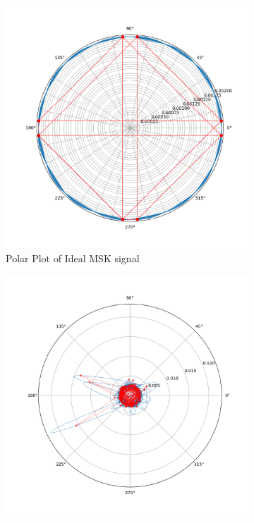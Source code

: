 \begin{figure}[H]
    \centering
    \begin{subfigure}[b]{0.4\textwidth}
        \centering
        \includegraphics[width = \textwidth]{figs/sim/veri/polar_control.png}
        \caption{Polar Plot of Ideal MSK signal}
        \label{fig:polarcontrol}
    \end{subfigure}
        \begin{subfigure}[b]{0.4\textwidth}
        \centering
        \includegraphics[width = \textwidth]{figs/sim/veri/polarreal.png}

\end{subfigure}
\end{figure}
